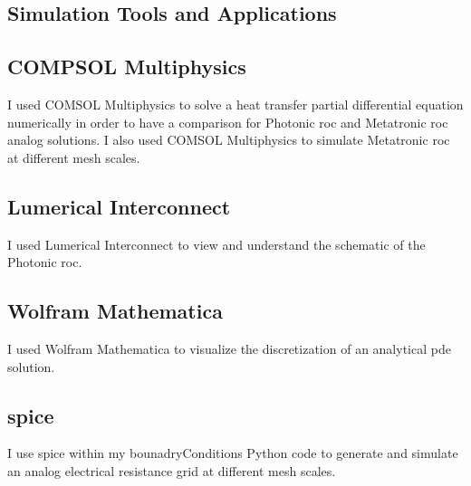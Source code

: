 \begin{appendices}
\section{Simulation Tools and Applications}\label{tools}

\subsection{\gls{COMPSOL Multiphysics}}
I used COMSOL Multiphysics to solve a heat transfer partial differential equation numerically in order to have a comparison for Photonic \acrshort{roc} and Metatronic \acrshort{roc} analog solutions. I also used COMSOL Multiphysics to simulate Metatronic \acrshort{roc} at different mesh scales.

\subsection{Lumerical Interconnect}
I used Lumerical Interconnect to view and understand the schematic of the Photonic \acrshort{roc}.

\subsection{Wolfram Mathematica}
I used Wolfram Mathematica to visualize the discretization of an analytical \acrshort {pde} solution.

\subsection{\acrfull{spice}}
I use \acrshort{spice} within my bounadryConditions Python code to generate and simulate an analog electrical resistance grid at different mesh scales.

\end{appendices}